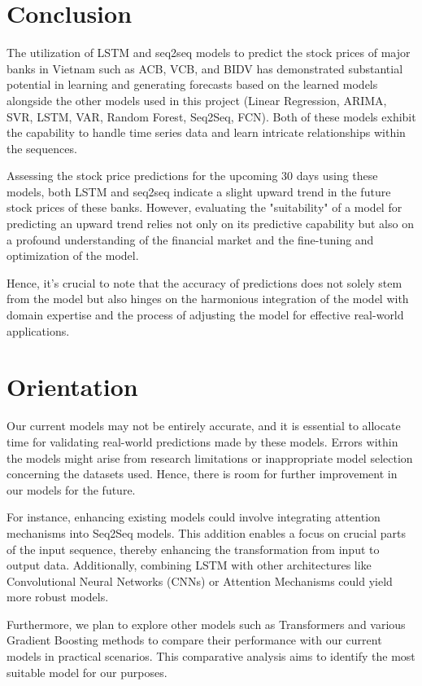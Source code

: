 \documentclass{ieeeojies}
\begin{document}
\section{Conclusion}
\hspace{1em}The utilization of LSTM and seq2seq models to predict the stock prices of major banks in Vietnam such as ACB, VCB, and BIDV has demonstrated substantial potential in learning and generating forecasts based on the learned models alongside the other models used in this project (Linear Regression, ARIMA, SVR, LSTM, VAR, Random Forest, Seq2Seq, FCN). Both of these models exhibit the capability to handle time series data and learn intricate relationships within the sequences.

Assessing the stock price predictions for the upcoming 30 days using these models, both LSTM and seq2seq indicate a slight upward trend in the future stock prices of these banks. However, evaluating the "suitability" of a model for predicting an upward trend relies not only on its predictive capability but also on a profound understanding of the financial market and the fine-tuning and optimization of the model.

Hence, it's crucial to note that the accuracy of predictions does not solely stem from the model but also hinges on the harmonious integration of the model with domain expertise and the process of adjusting the model for effective real-world applications. 

\section{Orientation}
\hspace{1em}Our current models may not be entirely accurate, and it is essential to allocate time for validating real-world predictions made by these models. Errors within the models might arise from research limitations or inappropriate model selection concerning the datasets used. Hence, there is room for further improvement in our models for the future.

For instance, enhancing existing models could involve integrating attention mechanisms into Seq2Seq models. This addition enables a focus on crucial parts of the input sequence, thereby enhancing the transformation from input to output data. Additionally, combining LSTM with other architectures like Convolutional Neural Networks (CNNs) or Attention Mechanisms could yield more robust models.

Furthermore, we plan to explore other models such as Transformers and various Gradient Boosting methods to compare their performance with our current models in practical scenarios. This comparative analysis aims to identify the most suitable model for our purposes.
\end{document}
